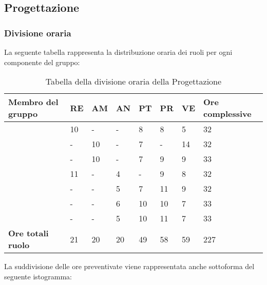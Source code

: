 \newpage
\subsection{Progettazione}

\subsubsection{Divisione oraria}
La seguente tabella rappresenta la distribuzione oraria dei ruoli per ogni componente del gruppo:
\renewcommand{\arraystretch}{2}
\begin{longtable}[h!] { C{4cm} C{1cm} C{1cm} C{1cm} C{1cm} C{1cm} C{1cm} C{3cm}}
\caption{Tabella della divisione oraria della Progettazione}\\
\rowcolor{\primaryColor}

\textcolor{\secondaryColor}{\textbf{Membro del gruppo}} & 
\textcolor{\secondaryColor}{\textbf{RE}} & 
\textcolor{\secondaryColor}{\textbf{AM}} & 
\textcolor{\secondaryColor}{\textbf{AN}} & 
\textcolor{\secondaryColor}{\textbf{PT}} & 
\textcolor{\secondaryColor}{\textbf{PR}} & 
\textcolor{\secondaryColor}{\textbf{VE}} & 
\textcolor{\secondaryColor}{\textbf{Ore complessive}}\\	
\endhead
        
\AW{}                     & 10  & - & - & 8 & 8 & 5 & 32 \\
\AT{}                     & -  & 10 & - & 7 & - & 14 & 32 \\
\AD{}                     & -  & 10 & - & 7 & 9 & 9 & 33 \\
\EC{}                     & 11  & - & 4 & - & 9 & 8 & 32 \\
\EM{}                     & -  & - & 5 & 7 & 11 & 9 & 32 \\
\FP{}                     & -  & - & 6 & 10 & 10 & 7 & 33 \\
\GG{}                     & -  & - & 5 & 10 & 11 & 7 & 33 \\
\textbf{Ore totali ruolo} & 21 & 20 & 20 & 49 & 58 & 59 & 227 \\

		
\end{longtable}
La suddivisione delle ore preventivate viene rappresentata anche sottoforma del seguente istogramma:
